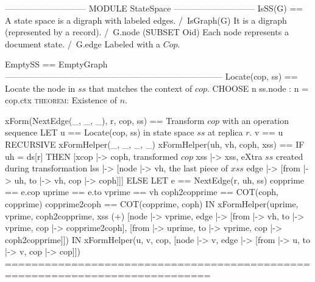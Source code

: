 \documentclass{article}
\begin{document}
\begin{tla}
----------------------------- MODULE StateSpace -----------------------------
IsSS(G) == \* A state space is a digraph with labeled edges.
    /\ IsGraph(G) \* It is a digraph (represented by a record).
    /\ G.node \subseteq (SUBSET Oid) \* Each node represents a document state.
    /\ G.edge  \* Labeled with a $Cop$.

EmptySS == EmptyGraph
-----------------------------------------------------------------------------
Locate(cop, ss) == \* Locate the node in $ss$ that matches the context of $cop$.     
    CHOOSE n \in ss.node : n = cop.ctx \* \textsc{theorem}: Existence of $n$.

xForm(NextEdge(_, _, _), r, cop, ss) == \* Transform $cop$ with an operation sequence 
    LET u == Locate(cop, ss)            \* in state space $ss$ at replica $r$.
        v == u 
        RECURSIVE xFormHelper(_, _, _, _)
        xFormHelper(uh, vh, coph, xss) == 
            IF uh = ds[r] THEN [xcop |-> coph, \* transformed $cop$
                                xss |-> xss,   \* eXtra $ss$ created during transformation
                                lss |-> [node |-> {vh}, \* the last piece of $xss$
                                         edge |-> {[from |-> uh, to |-> vh, cop |-> coph]}]]
            ELSE LET e == NextEdge(r, uh, ss)
                     copprime == e.cop
                     uprime == e.to
                     vprime == vh 
                      coph2copprime == COT(coph, copprime)
                     copprime2coph == COT(copprime, coph)
                 IN  xFormHelper(uprime, vprime, coph2copprime,
                        xss (+) [node |-> {vprime},
                                 edge |-> {[from |-> vh, to |-> vprime, 
                                             cop |-> copprime2coph], 
                                           [from |-> uprime, to |-> vprime, 
                                             cop |-> coph2copprime]}])
    IN  xFormHelper(u, v, cop, [node |-> {v}, 
                                edge |-> {[from |-> u, to |-> v, cop |-> cop]}])  
=============================================================================
\end{tla}
\end{document}
